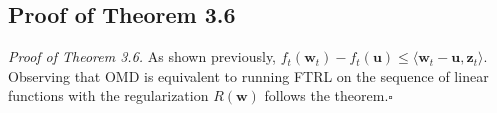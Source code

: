 \documentclass{article}
\newcommand*{\qed}{\null\nobreak\hfill\ensuremath{\square}}%
\begin{document}
\subsection{Proof of Theorem 3.6}
{\it Proof of Theorem 3.6.} As shown previously, $f_t(\textbf{w}_t)-f_t(\textbf{u})\leq \langle \textbf{w}_t-\textbf{u}, \textbf{z}_t\rangle$. Observing that OMD is equivalent to running FTRL on the sequence of linear functions with the regularization $R(\textbf{w})$ follows the theorem.\qed
\end{document}
